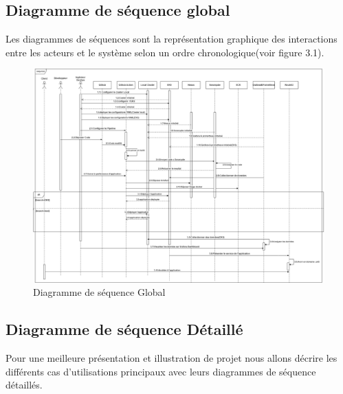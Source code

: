             \subsection{\selectfont\Large Diagramme de séquence global}
         Les diagrammes de séquences sont la représentation graphique des interactions entre les acteurs et le système selon un ordre chronologique\cite{14}(voir figure 3.1).
            
              
            
            \begin{landscape}
              \begin{figure}[htbp]
                \centering
                \includegraphics[width=24cm]{Squence.drawio.png} %
                \caption{Diagramme de séquence Global}
              
              \end{figure}
            \end{landscape}
            \subsection{\selectfont\Large Diagramme de séquence Détaillé}
            Pour une meilleure présentation et illustration de projet nous allons décrire les différents cas d'utilisations principaux avec leurs diagrammes de séquence détaillés.
